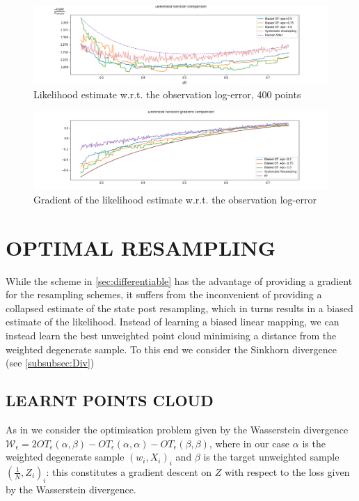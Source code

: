 \documentclass[]{article}
\begin{document}
			
			\begin{figure}
				\centering
				\captionsetup{justification=centering}
				\includegraphics[width=\textwidth]{likelihood}
				\caption{Likelihood estimate w.r.t. the observation log-error, 400 points}
				\label{fig:likelihood}
			\end{figure}
			
			\begin{figure}
				\centering
				\captionsetup{justification=centering}
				\includegraphics[width=\textwidth]{likelihoodGradient}
				\caption{Gradient of the likelihood estimate w.r.t. the observation log-error}
				\label{fig:likelihoodGradient}
			\end{figure}
			

\section{OPTIMAL RESAMPLING}
\label{sec:optimal}

	While the scheme in \cref{sec:differentiable} has the advantage of providing a gradient for the resampling schemes, it suffers from the inconvenient of providing a collapsed estimate of the state post resampling, which in turns results in a biased estimate of the likelihood. Instead of learning a biased linear mapping, we can instead learn the best unweighted point cloud minimising a distance from the weighted degenerate sample. To this end we consider the Sinkhorn divergence (see \cref{subsubsec:Div})
	
	\subsection{LEARNT POINTS CLOUD}
		As in \cite{genevay2017learning} we consider the optimisation problem given by the Wasserstein divergence $\mathcal{W}_\epsilon = 2 OT_{\epsilon}(\alpha,\beta) - OT_{\epsilon}(\alpha,\alpha) - OT_{\epsilon}(\beta,\beta)$, where in our case $\alpha$ is the weighted degenerate sample $(w_i, X_i)_i$ and $\beta$ is the target unweighted sample $(\frac 1 N, Z_i)_i$: this constitutes a gradient descent on $Z$ with respect to the loss given by the Wasserstein divergence.
		
\end{document}
